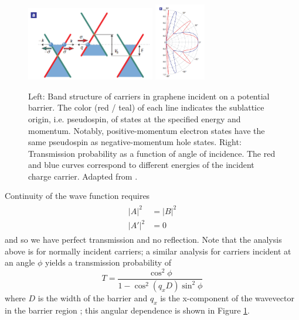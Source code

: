 \documentclass[edeposit,fullpage,draftthesis]{uiucthesis2009}
\begin{document}
        \begin{figure}
            \centering
            \includegraphics[width=0.5\textwidth]{images/background/pseudospin.png}
            \includegraphics[width=0.2\textwidth]{images/background/klein_angle.png}
            \caption[Klein tunneling in graphene]{
            Left: Band structure of carriers in graphene incident on a potential barrier. 
            The color (red / teal) of
            each line indicates the sublattice origin, i.e. pseudospin, of states at the 
            specified energy and momentum. Notably, 
            positive-momentum electron states have the same pseudospin as negative-momentum 
            hole states.
            Right: Transmission probability as a function of angle of incidence. The red and blue
            curves correspond to different energies of the incident charge carrier.
            Adapted from \cite{katsnelson2006chiral}.
            }
            \label{fig:pseudospin}
        \end{figure}
        Continuity of the wave function requires
        \begin{align}
        \begin{split}
            \left|A\right|^2  &= \left|B\right|^2 \\
            \left|A'\right|^2 &= 0
        \end{split}
        \end{align}
        and so we have perfect transmission and no reflection. Note that the analysis above is for normally
        incident carriers; a similar analysis for carriers incident at an angle $\phi$ yields a transmission
        probability of 
        \begin{equation}
            T = \frac{\cos^2{\phi}}{1 - \cos^2{(q_x D)} \sin^2{\phi}}
        \end{equation}
        where $D$ is the width of the barrier and $q_x$ is the x-component of the wavevector in the 
        barrier region \cite{katsnelson2006chiral}; this angular dependence is shown in Figure \ref{fig:pseudospin}.
        
\end{document}
